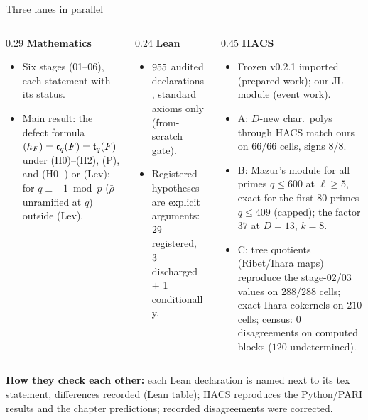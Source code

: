\begin{frame}{Three lanes in parallel}
  \footnotesize
  \begin{columns}[T]
    \begin{column}{0.29\textwidth}
      \textbf{Mathematics}
      \begin{itemize}\setlength{\itemsep}{1pt}
        \item Six stages (01--06), each statement with its status.
        \item Main result: the defect formula $(h_F)=\mathfrak c_q(F)=\mathfrak t_q(F)$  under (H0)--(H2), (P),
          and (H0$^-$) or (Lev);  for $q\equiv-1\bmod p$ ($\bar\rho$ unramified at $q$) outside (Lev).
      \end{itemize}
    \end{column}
    \begin{column}{0.24\textwidth}
      \textbf{Lean}
      \begin{itemize}\setlength{\itemsep}{1pt}
        \item $955$ audited declarations, standard axioms only (from-scratch gate).
        \item Registered hypotheses are explicit arguments: $29$ registered, $3$ discharged
          $+$ $1$ conditionally.
      \end{itemize}
    \end{column}
    \begin{column}{0.45\textwidth}
      \textbf{HACS} 
      \begin{itemize}\setlength{\itemsep}{1pt}
        \item Frozen v0.2.1 imported (prepared work); our JL module (event work).
        \item A: $D$-new char.\ polys through HACS match ours on $66/66$ cells, signs $8/8$.
        \item B: Mazur's module for all primes $q\le600$ at $\ell\ge5$, exact for the first $80$ primes $q\le409$ (capped); the factor $37$ at $D=13$, $k=8$.
        \item C: tree quotients (Ribet/Ihara maps) reproduce the stage-02/03 values on $288/288$ cells; exact Ihara cokernels on $210$ cells; census: $0$ disagreements on computed blocks ($120$ undetermined).
      \end{itemize}
    \end{column}
  \end{columns}
  \smallskip
  \textbf{How they check each other:} each Lean declaration is named next to its tex statement, differences recorded (Lean table); HACS reproduces the Python/PARI results and the
  chapter predictions; recorded disagreements were corrected.
\end{frame}
